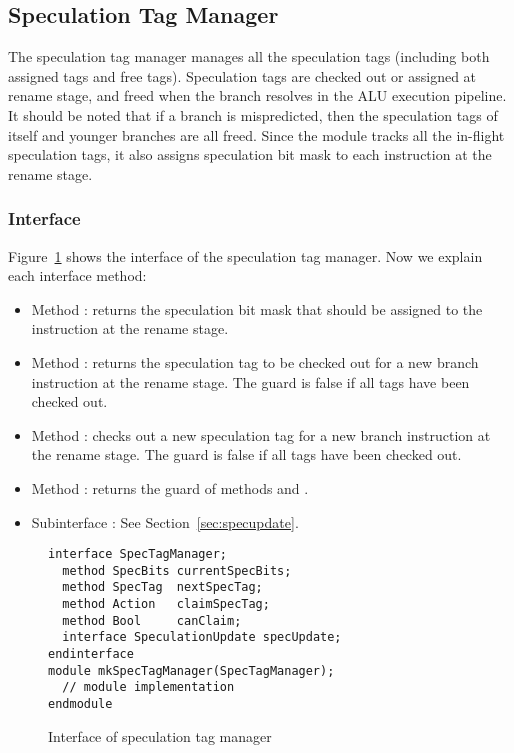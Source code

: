 \subsection{Speculation Tag Manager}\label{sec:spectag}

The speculation tag manager manages all the speculation tags (including both assigned tags and free tags).
Speculation tags are checked out or assigned at rename stage, and freed when the branch resolves in the ALU execution pipeline.
It should be noted that if a branch is mispredicted, then the speculation tags of itself and younger branches are all freed.
Since the module tracks all the in-flight speculation tags, it also assigns speculation bit mask to each instruction at the rename stage.

\subsubsection{Interface}

Figure~\ref{fig:spectag-ifc} shows the interface of the speculation tag manager.
Now we explain each interface method:
\begin{itemize}
    \item Method : returns the speculation bit mask that should be assigned to the instruction at the rename stage.
    
    \item Method : returns the speculation tag to be checked out for a new branch instruction at the rename stage.
    The guard is false if all tags have been checked out.
    
    \item Method : checks out a new speculation tag for a new branch instruction at the rename stage.
    The guard is false if all tags have been checked out.
    
    \item Method : returns the guard of methods  and .
    
    \item Subinterface : See Section~\ref{sec:specupdate}.
\end{itemize}

\begin{figure}
\begin{lstlisting}[caption={}]
interface SpecTagManager;
  method SpecBits currentSpecBits;
  method SpecTag  nextSpecTag;
  method Action   claimSpecTag;
  method Bool     canClaim;
  interface SpeculationUpdate specUpdate;
endinterface
module mkSpecTagManager(SpecTagManager);
  // module implementation
endmodule
\end{lstlisting}
\caption{Interface of speculation tag manager}\label{fig:spectag-ifc}
\end{figure}

